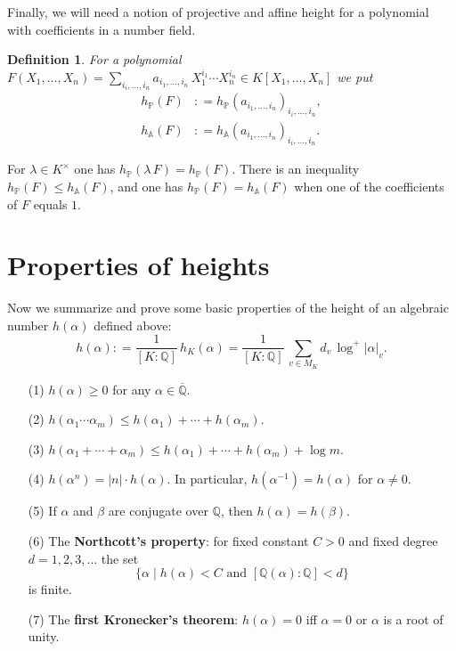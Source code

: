 \documentclass{article}
\newcommand{\term}{\textbf}
\newcommand{\dfn}{\mathrel{\mathop:}=}
\newcommand{\QQ}{\mathbb{Q}}
\theoremstyle{myplain}
\theoremstyle{mydefinition}
\newtheorem{definition}[proposition]{Definition}
\begin{document}
Finally, we will need a notion of projective and affine height for a polynomial
with coefficients in a number field.

\begin{definition}
  For a polynomial
  $F (X_1, \ldots, X_n) = \sum_{i_i,\ldots,i_n} a_{i_1,\ldots,i_n} \, X_1^{i_1}\cdots X_n^{i_n} \in K [X_1, \ldots, X_n]$
  we put
  \begin{align*}
    h_\mathbb{P} (F) & \dfn h_\mathbb{P} (a_{i_1,\ldots,i_n})_{i_i,\ldots,i_n}, \\
    h_\mathbb{A} (F) & \dfn h_\mathbb{A} (a_{i_1,\ldots,i_n})_{i_i,\ldots,i_n}.
  \end{align*}
\end{definition}

For $\lambda \in K^\times$ one has
$h_\mathbb{P} (\lambda\,F) = h_\mathbb{P} (F)$. There is an inequality
$h_\mathbb{P} (F) \le h_\mathbb{A} (F)$, and one has
$h_\mathbb{P} (F) = h_\mathbb{A} (F)$ when one of the coefficients of $F$ equals
$1$.

\section{Properties of heights}

Now we summarize and prove some basic properties of the height of an algebraic
number $h (\alpha)$ defined above:
\[ h (\alpha) \dfn \frac{1}{[K : \QQ]} \, h_K (\alpha) =
  \frac{1}{[K : \QQ]} \, \sum_{v \in M_K} d_v \, \log^+ |\alpha|_v. \]

\begin{enumerate}
\item[(1)] $h (\alpha) \ge 0$ for any $\alpha \in \overline{\QQ}$.

\item[(2)] $h (\alpha_1 \cdots \alpha_m) \le h (\alpha_1) + \cdots + h (\alpha_m)$.

\item[(3)] $h (\alpha_1 + \cdots + \alpha_m) \le h (\alpha_1) + \cdots + h (\alpha_m) + \log m$.

\item[(4)] $h (\alpha^n) = |n| \cdot h (\alpha)$. In particular,
  $h (\alpha^{-1}) = h (\alpha)$ for $\alpha \ne 0$.

\item[(5)] If $\alpha$ and $\beta$ are conjugate over $\QQ$, then
  $h (\alpha) = h (\beta)$.

\item[(6)] The \term{Northcott's property}: for fixed constant $C > 0$ and fixed
  degree $d = 1, 2, 3, \ldots$ the set
  $$\{ \alpha \mid h (\alpha) < C \text{ and } [\QQ (\alpha) : \QQ] < d \}$$
  is finite.

\item[(7)] The \term{first Kronecker's theorem}: $h (\alpha) = 0$ iff
  $\alpha = 0$ or $\alpha$ is a root of unity.
\end{enumerate}
\end{document}
